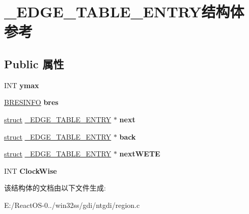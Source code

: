 \hypertarget{struct___e_d_g_e___t_a_b_l_e___e_n_t_r_y}{}\section{\+\_\+\+E\+D\+G\+E\+\_\+\+T\+A\+B\+L\+E\+\_\+\+E\+N\+T\+R\+Y结构体 参考}
\label{struct___e_d_g_e___t_a_b_l_e___e_n_t_r_y}
\subsection*{Public 属性}
\begin{DoxyCompactItemize}
\item 
\mbox{\label{struct___e_d_g_e___t_a_b_l_e___e_n_t_r_y_a9bff4080c5199748632c03cee4f0d588}} 
I\+NT {\bfseries ymax}
\item 
\mbox{\label{struct___e_d_g_e___t_a_b_l_e___e_n_t_r_y_a4219f41efcecb55e8f9f38049e5bde20}} 
\hyperlink{struct_b_r_e_s_i_n_f_o}{B\+R\+E\+S\+I\+N\+FO} {\bfseries bres}
\item 
\mbox{\label{struct___e_d_g_e___t_a_b_l_e___e_n_t_r_y_af20388fe34b55cdd7695e4aa940bca58}} 
\hyperlink{interfacestruct}{struct} \hyperlink{struct___e_d_g_e___t_a_b_l_e___e_n_t_r_y}{\+\_\+\+E\+D\+G\+E\+\_\+\+T\+A\+B\+L\+E\+\_\+\+E\+N\+T\+RY} $\ast$ {\bfseries next}
\item 
\mbox{\label{struct___e_d_g_e___t_a_b_l_e___e_n_t_r_y_ae4e46b8f6c467f6aba7983c8f5e98642}} 
\hyperlink{interfacestruct}{struct} \hyperlink{struct___e_d_g_e___t_a_b_l_e___e_n_t_r_y}{\+\_\+\+E\+D\+G\+E\+\_\+\+T\+A\+B\+L\+E\+\_\+\+E\+N\+T\+RY} $\ast$ {\bfseries back}
\item 
\mbox{\label{struct___e_d_g_e___t_a_b_l_e___e_n_t_r_y_a4a998e818aa48ce11e2e429bef05cfe4}} 
\hyperlink{interfacestruct}{struct} \hyperlink{struct___e_d_g_e___t_a_b_l_e___e_n_t_r_y}{\+\_\+\+E\+D\+G\+E\+\_\+\+T\+A\+B\+L\+E\+\_\+\+E\+N\+T\+RY} $\ast$ {\bfseries next\+W\+E\+TE}
\item 
\mbox{\label{struct___e_d_g_e___t_a_b_l_e___e_n_t_r_y_a7c37bd10a15fefea39689ea84865144e}} 
I\+NT {\bfseries Clock\+Wise}
\end{DoxyCompactItemize}


该结构体的文档由以下文件生成\+:\begin{DoxyCompactItemize}
\item 
E\+:/\+React\+O\+S-\/0../win32ss/gdi/ntgdi/region.\+c\end{DoxyCompactItemize}

